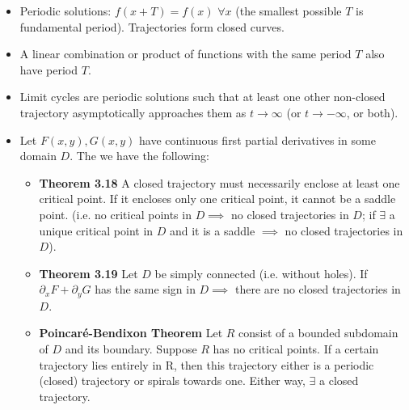 \documentclass[10pt,landscape]{article}
\begin{document}
\begin{multicols}{2}
\begin{itemize}
    \item Periodic solutions: $f(x+T) = f(x)$ $\forall x$ (the smallest possible $T$ is fundamental period). Trajectories form closed curves. 
    \item A linear combination or product of functions with the same period $T$ also have period $T$. 
    \item Limit cycles are periodic solutions such that at least one other non-closed trajectory asymptotically approaches them as \( t \to \infty \) (or \( t \to -\infty \), or both).
    \item Let $F(x,y), G(x,y)$ have continuous first partial derivatives in some domain $D$. The we have the following:\\ \begin{itemize}
	
\item \textbf{Theorem 3.18}  A closed trajectory must necessarily enclose at least one critical point. If it encloses only one critical point, it cannot be a saddle point. (i.e. no critical points in $D \implies$ no closed trajectories in $D$; if $\exists$ a unique critical point in $D$ and it is a saddle $\implies$ no closed trajectories in $D$).\\
	
        \item \textbf{Theorem 3.19} Let $D$ be simply connected (i.e. without holes). If $\partial_xF + \partial_yG$ has the same sign in $D \implies$ there are no closed trajectories in $D$.\\
        
        \item \textbf{Poincar\'e-Bendixon Theorem} Let $R$ consist of a bounded subdomain of $D$ and its boundary. Suppose $R$ has no critical points. If a certain trajectory lies entirely in R, then this trajectory either is a periodic (closed) trajectory or spirals towards one. Either way,  $\exists$ a closed trajectory.
        \end{itemize}
           \end{itemize}


\end{multicols}
\end{document}
